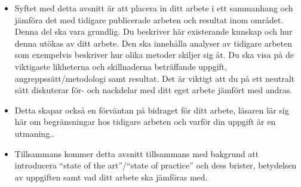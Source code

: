 {\color{blue}
\begin{itemize}
  \item Syftet med detta avsnitt \"ar att placera in ditt arbete i ett sammanhang och j\"amf\"ora det med tidigare publicerade arbeten och resultat inom omr\r{a}det. Denna del ska vara grundlig. Du beskriver h\"ar existerande kunskap och hur denna ut\"okas av ditt arbete. Den ska inneh\r{a}lla analyser av tidigare arbeten som exempelvis beskriver hur olika metoder skiljer sig \r{a}t. Du ska visa p\r{a} de viktigaste likheterna och skillnaderna betr\"affande uppgift, angreppss\"att/metodologi samt resultat. Det \"ar viktigt att du p\r{a} ett neutralt s\"att diskuterar f\"or- och nackdelar med ditt eget arbete j\"amf\"ort med andras.
  \item Detta skapar ocks\r{a} en f\"orv\"antan p\r{a} bidraget f\"or ditt arbete, l\"asaren l\"ar sig h\"ar om begr\"ansningar hos tidigare arbeten och varf\"or din uppgift \"ar en utmaning..
  \item Tillsammans kommer detta avsnitt tillsammans med bakgrund att introducera ``state of the art''/``state of practice'' och dess brister, betydelsen av uppgiften samt vad ditt arbete ska j\"amf\"oras med.
\end{itemize}




}
